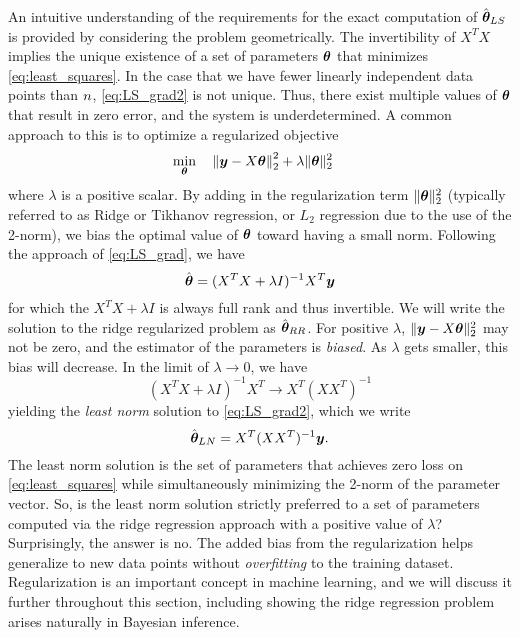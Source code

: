 An intuitive understanding of the requirements for the exact computation of $\hat{\bm{\theta}}_{LS}$ is provided by considering the problem geometrically. The invertibility of $X^T X$ implies the unique existence of a set of parameters $\bm{\theta}$ that minimizes \eqref{eq:least_squares}. In the case that we have fewer linearly independent data points than $n$, \eqref{eq:LS_grad2} is not unique. Thus, there exist multiple values of $\bm{\theta}$ that result in zero error, and the system is underdetermined. A common approach to this is to optimize a regularized objective
\begin{equation}
\begin{aligned}
& \underset{\bm{\theta}}{\min}
& & \left\| \bm{y} - X \bm{\theta} \right\|_2^2 + \lambda \|\bm{\theta}\|^2_2
\end{aligned}
\label{eq:least_squares_norm}
\end{equation}
where $\lambda$ is a positive scalar. By adding in the regularization term $\|\bm{\theta}\|^2_2$ (typically referred to as Ridge or Tikhanov regression, or $L_2$ regression due to the use of the 2-norm), we bias the optimal value of $\bm{\theta}$ toward having a small norm. Following the approach of \eqref{eq:LS_grad}, we have 
\begin{equation}
    \hat{\bm{\theta}} = (X^T X + \lambda I)^{-1} X^T \bm{y}
    \label{eq:LS_grad}
\end{equation}
for which the $X^T X + \lambda I$ is always full rank and thus invertible. We will write the solution to the ridge regularized problem as $\hat{\bm{\theta}}_{RR}$. For positive $\lambda$, $\| \bm{y} - X \bm{\theta}\|_2^2$ may not be zero, and the estimator of the parameters is \textit{biased}. As $\lambda$ gets smaller, this bias will decrease. In the limit of $\lambda \to 0$, we have 
\begin{equation}
    (X^T X + \lambda I)^{-1} X^T \to X^T (X X^T)^{-1}
\end{equation}
yielding the \textit{least norm} solution to \eqref{eq:LS_grad2}, which we write
\begin{equation}
    \hat{\bm{\theta}}_{LN} = X^T (X X^T)^{-1} \bm{y}.
    \label{eq:least_norm}
\end{equation}
The least norm solution is the set of parameters that achieves zero loss on \eqref{eq:least_squares} while simultaneously minimizing the 2-norm of the parameter vector. So, is the least norm solution strictly preferred to a set of parameters computed via the ridge regression approach with a positive value of $\lambda$? Surprisingly, the answer is no. The added bias from the regularization helps generalize to new data points without \textit{overfitting} to the training dataset. Regularization is an important concept in machine learning, and we will discuss it further throughout this section, including showing the ridge regression problem arises naturally in Bayesian inference.

